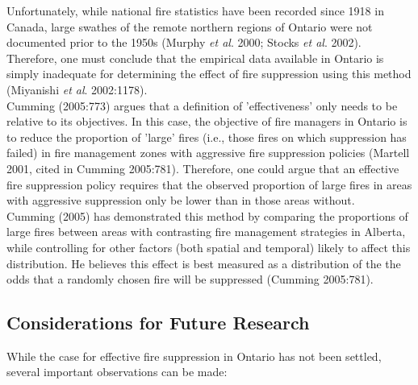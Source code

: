 \begin{spacing}{1.5}
\clearpage

\noindent Unfortunately, while national fire statistics have been recorded since 1918 in Canada, large swathes of the remote northern regions of Ontario were not documented prior to the 1950s (Murphy \emph{et al}. 2000; Stocks \emph{et al}. 2002).  Therefore, one must conclude that the empirical data available in Ontario is simply inadequate for determining the effect of fire suppression using this method (Miyanishi \emph{et al}. 2002:1178). \\

\noindent Cumming (2005:773) argues that a definition of 'effectiveness' only needs to be relative to its objectives. In this case, the objective of fire managers in Ontario is to reduce the proportion of 'large' fires (i.e., those fires on which suppression has failed) in fire management zones with aggressive fire suppression policies (Martell 2001, cited in Cumming 2005:781). Therefore, one could argue that an effective fire suppression policy  requires that the observed proportion of large fires in areas with aggressive suppression only be lower than in those areas without. \\

\noindent Cumming (2005) has demonstrated this method by comparing the proportions of large fires between areas with contrasting fire management strategies in Alberta, while controlling for other factors (both spatial and temporal) likely to affect this distribution. He believes this effect is best measured as a distribution of the the odds that a randomly chosen fire will be suppressed (Cumming 2005:781).

\subsection{Considerations for Future Research}

While the case for effective fire suppression in Ontario has not been settled, several important observations can be made:


\end{spacing}
